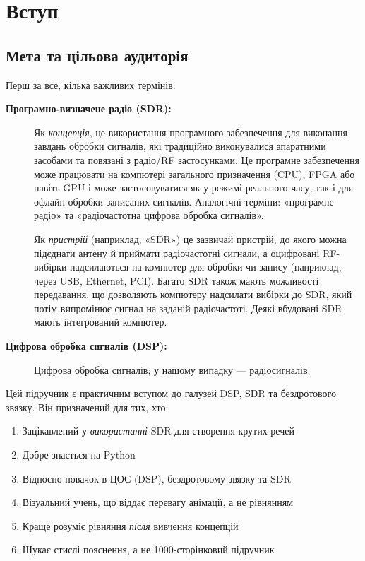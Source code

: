 \chapter{Вступ}\label{intro-chapter}

\section{Мета та цільова
аудиторія}\label{ux43cux435ux442ux430-ux442ux430-ux446ux456ux43bux44cux43eux432ux430-ux430ux443ux434ux438ux442ux43eux440ux456ux44f}

Перш за все, кілька важливих термінів:

\begin{description}
\item[\textbf{Програмно-визначене радіо (SDR):}]
Як \emph{концепція}, це використання програмного забезпечення для
виконання завдань обробки сигналів, які традиційно виконувалися
апаратними засобами та пов\textquotesingle язані з радіо/RF
застосунками. Це програмне забезпечення може працювати на
комп\textquotesingle ютері загального призначення (CPU), FPGA або навіть
GPU і може застосовуватися як у режимі реального часу, так і для
офлайн-обробки записаних сигналів. Аналогічні терміни: «програмне радіо»
та «радіочастотна цифрова обробка сигналів».

Як \emph{пристрій} (наприклад, «SDR») це зазвичай пристрій, до якого
можна під\textquotesingle єднати антену й приймати радіочастотні
сигнали, а оцифровані RF-вибірки надсилаються на
комп\textquotesingle ютер для обробки чи запису (наприклад, через USB,
Ethernet, PCI). Багато SDR також мають можливості передавання, що
дозволяють комп\textquotesingle ютеру надсилати вибірки до SDR, який
потім випромінює сигнал на заданій радіочастоті. Деякі вбудовані SDR
мають інтегрований комп\textquotesingle ютер.
\item[\textbf{Цифрова обробка сигналів (DSP):}]
Цифрова обробка сигналів; у нашому випадку --- радіосигналів.
\end{description}

Цей підручник є практичним вступом до галузей DSP, SDR та бездротового
зв\textquotesingle язку. Він призначений для тих, хто:

\begin{enumerate}
\tightlist
\item
  Зацікавлений у \emph{використанні} SDR для створення крутих речей
\item
  Добре знається на Python
\item
  Відносно новачок в ЦОС (DSP), бездротовому зв\textquotesingle язку та
  SDR
\item
  Візуальний учень, що віддає перевагу анімації, а не рівнянням
\item
  Краще розуміє рівняння \emph{після} вивчення концепцій
\item
  Шукає стислі пояснення, а не 1000-сторінковий підручник
\end{enumerate}

